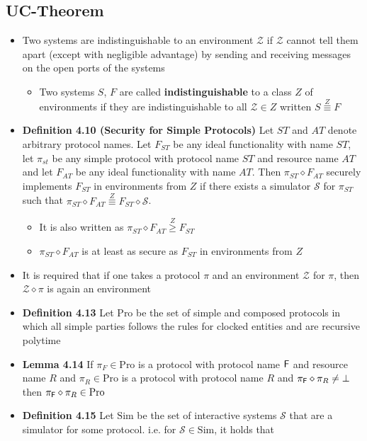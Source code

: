 \subsection{UC-Theorem}
\begin{itemize}
  \item Two systems are indistinguishable to an environment $\mathcal Z$ if $\mathcal Z$ cannot tell them apart (except with negligible advantage) by sending and receiving messages on the open ports of the systems
  \begin{itemize}
  	\item Two systems $S$, $F$ are called \textbf{indistinguishable} to a class $Z$ of environments if they are indistinguishable to all $\mathcal Z \in Z$ written $S \stackrel{Z}{\equiv} F$
  \end{itemize}
  \item \textbf{Definition 4.10 (Security for Simple Protocols)} Let $ST$ and $AT$ denote arbitrary protocol names. Let $F_{ST}$ be any ideal functionality with name $ST$, let $\pi_{st}$ be any simple protocol with protocol name $ST$ and resource name $AT$ and let $F_{AT}$ be any ideal functionality with name $AT$. Then $\pi_{ST} \diamond F_{AT}$ securely implements $F_{ST}$ in environments from $Z$ if there exists a simulator $\mathcal{S}$ for $\pi_{ST}$ such that $\pi_{ST} \diamond F_{AT} \stackrel{Z}{\equiv} F_{ST} \diamond \mathcal S$.
  \begin{itemize}
  	\item It is also written as $\pi_{ST} \diamond F_{AT} \stackrel{Z}{\geq} F_{ST}$
  	\item $\pi_{ST} \diamond F_{AT}$ is at least as secure as $F_{ST}$ in environments from $Z$
  \end{itemize}
  \item It is required that if one takes a protocol $\pi$ and an environment $\mathcal Z$ for $\pi$, then $\mathcal Z \diamond \pi$ is again an environment
  \item \textbf{Definition 4.13} Let $\text{Pro}$ be the set of simple and composed protocols in which all simple parties follows the rules for clocked entities and are recursive polytime
  \item \textbf{Lemma 4.14} If $\pi_F \in \text{Pro}$ is a protocol with protocol name $\mathsf{F}$ and resource name $R$ and $\pi_R \in \text{Pro}$ is a protocol with protocol name $R$ and $\pi_{\mathsf{F}} \diamond \pi_R \neq \bot$ then $\pi_{\mathsf{F}} \diamond \pi_R \in \text{Pro}$
  \item \textbf{Definition 4.15} Let $\text{Sim}$ be the set of interactive systems $\mathcal S$ that are a simulator for some protocol. i.e. for $\mathcal S \in \text{Sim}$, it holds that

\end{itemize}

